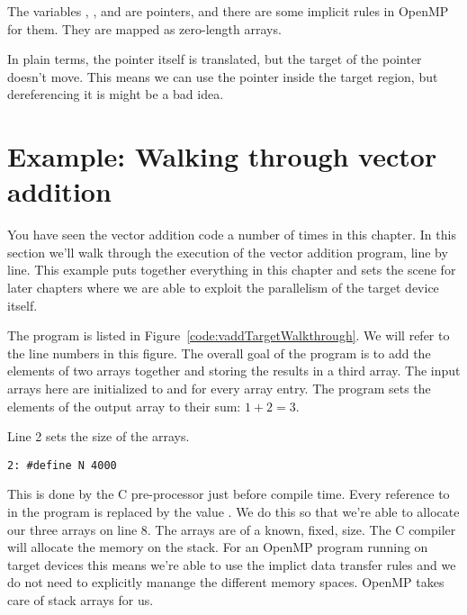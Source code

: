 The variables , , and  are pointers, and there are some implicit rules in OpenMP for them.
They are mapped as zero-length arrays.

In plain terms, the pointer itself is translated, but the target of the pointer doesn't move.
This means we can use the pointer inside the target region, but dereferencing it is might be a bad idea.


\section{Example: Walking through vector addition}

You have seen the vector addition code a number of times in this chapter.
In this section we'll walk through the execution of the vector addition program, line by line.
This example puts together everything in this chapter and sets the scene for later chapters where we are able to exploit the parallelism of the target device itself.

The program is listed in Figure~\ref{code:vaddTargetWalkthrough}.
We will refer to the line numbers in this figure.
The overall goal of the program is to add the elements of two arrays together and storing the results in a third array.
The input arrays here are initialized to  and  for every array entry.
The program sets the elements of the output array to their sum: $1+2=3$.

Line 2 sets the size of the arrays.
\begin{verbatim}
2: #define N 4000
\end{verbatim}
This is done by the C pre-processor just before compile time.
Every reference to  in the program is replaced by the value .
We do this so that we're able to allocate our three arrays on line 8.
The arrays are of a known, fixed, size.
The C compiler will allocate the memory on the stack.
For an OpenMP program running on target devices this means we're able to use the implict data transfer rules and we do not need to explicitly manange the different memory spaces.
OpenMP takes care of stack arrays for us.

